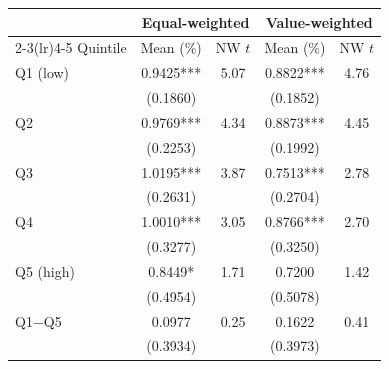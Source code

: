 \begin{tabular}{lcccc}
\toprule
 & \multicolumn{2}{c}{Equal-weighted} & \multicolumn{2}{c}{Value-weighted} \\
\cmidrule(lr){2-3}\cmidrule(lr){4-5}
Quintile & Mean (\%) & NW $t$ & Mean (\%) & NW $t$ \\
\midrule
Q1 (low) & 0.9425*** & 5.07 & 0.8822*** & 4.76 \\
 & (0.1860) &  & (0.1852) &  \\
Q2 & 0.9769*** & 4.34 & 0.8873*** & 4.45 \\
 & (0.2253) &  & (0.1992) &  \\
Q3 & 1.0195*** & 3.87 & 0.7513*** & 2.78 \\
 & (0.2631) &  & (0.2704) &  \\
Q4 & 1.0010*** & 3.05 & 0.8766*** & 2.70 \\
 & (0.3277) &  & (0.3250) &  \\
Q5 (high) & 0.8449* & 1.71 & 0.7200 & 1.42 \\
 & (0.4954) &  & (0.5078) &  \\
\midrule
Q1$-$Q5 & 0.0977 & 0.25 & 0.1622 & 0.41 \\
 & (0.3934) &  & (0.3973) &  \\
\bottomrule
\end{tabular}
